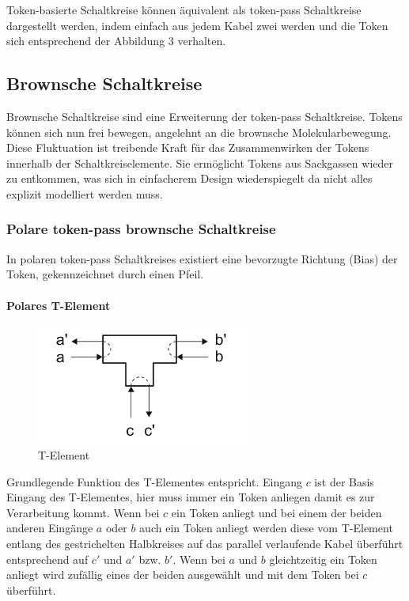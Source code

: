 \documentclass[11pt,a4paper]{article}
\begin{document}
Token-basierte Schaltkreise können äquivalent als token-pass Schaltkreise 
dargestellt werden, indem einfach aus jedem Kabel zwei werden und die Token 
sich entsprechend der Abbildung 3 verhalten.


\subsection{Brownsche Schaltkreise}
Brownsche Schaltkreise sind eine Erweiterung der token-pass Schaltkreise. 
%
Tokens können sich nun frei bewegen, angelehnt an die
brownsche Molekularbewegung.
%
Diese Fluktuation ist treibende Kraft für das Zusammenwirken der Tokens 
innerhalb der Schaltkreiselemente. 
%
Sie ermöglicht Tokens aus Sackgassen wieder zu entkommen,
was sich in einfacherem Design wiederspiegelt da nicht alles explizit 
modelliert werden muss.


\subsubsection{Polare token-pass brownsche Schaltkreise}
In polaren token-pass Schaltkreises existiert eine bevorzugte Richtung (Bias)
der Token, gekennzeichnet durch einen Pfeil.
%

\paragraph{Polares T-Element}
\begin{figure}[h]
    \centering
    \includegraphics[width=7cm]{bilder/T_Element.png}
    \caption{T-Element}
    \label{fig:T_Element}
\end{figure}

Grundlegende Funktion des T-Elementes entspricht. 
%
Eingang $ c $ ist der Basis Eingang des T-Elementes, hier muss immer ein Token
anliegen damit es zur Verarbeitung kommt.
%
Wenn bei $ c $ ein Token anliegt und bei einem der beiden anderen
Eingänge $ a $ oder $ b $ auch ein Token anliegt werden diese vom T-Element 
entlang des gestrichelten Halbkreises auf das parallel verlaufende 
Kabel überführt entsprechend auf $ c' $  und $ a'$  bzw. $ b' $.
%
Wenn bei $ a $ und $ b $ gleichtzeitig ein Token anliegt wird zufällig 
eines der beiden ausgewählt und mit dem Token bei $ c $ überführt.
 
\end{document}
